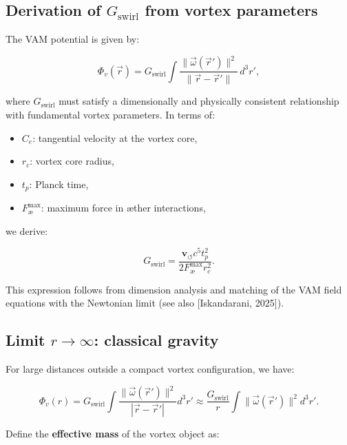 \documentclass[preprint]{revtex4-2}
\begin{document}
\subsection{Derivation of $G_\text{swirl}$ from vortex parameters}

The VAM potential is given by:

\begin{equation}
  \Phi_v(\vec{r}) = G_\text{swirl} \int \frac{\|\vec{\omega}(\vec{r}')\|^2}{\|\vec{r} - \vec{r}'\|} \, d^3r',
\end{equation}

where $G_\text{swirl}$ must satisfy a dimensionally and physically consistent relationship with fundamental vortex parameters. In terms of:

\begin{itemize}
  \item $C_e$: tangential velocity at the vortex core,
  \item $r_c$: vortex core radius,
  \item $t_p$: Planck time,
  \item $F^{\text{max}}_{\text{\ae}}$: maximum force in æther interactions,
\end{itemize}

we derive:

\begin{equation}
  G_\text{swirl} = \frac{\mathbf{v}_{\scriptscriptstyle\boldsymbol{\circlearrowleft}} c^5 t_p^2}{2 F^{\text{max}}_{\text{\ae}} r_c^2}.
\end{equation}

This expression follows from dimension analysis and matching of the VAM field equations with the Newtonian limit (see also [Iskandarani, 2025]).

\subsection{Limit $r \to \infty$: classical gravity}

For large distances outside a compact vortex configuration, we have:

\begin{equation}
  \Phi_v(r) = G_\text{swirl} \int \frac{\|\vec{\omega}(\vec{r}')\|^2}{|\vec{r} - \vec{r}'|} d^3r' \approx \frac{G_\text{swirl}}{r} \int \|\vec{\omega}(\vec{r}')\|^2 d^3r'.
\end{equation}

Define the \textbf{effective mass} of the vortex object as:
\end{document}
